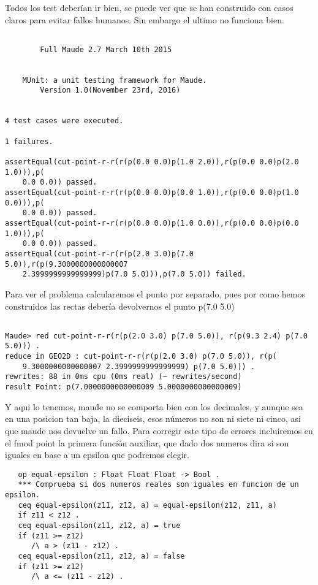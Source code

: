 Todos los test deber\'ian ir bien, se puede ver que se han construido con casos claros para evitar fallos humanos. Sin embargo el ultimo no funciona bien.

\begin{verbatim}

	    Full Maude 2.7 March 10th 2015


	MUnit: a unit testing framework for Maude.
		Version 1.0(November 23rd, 2016)


4 test cases were executed.

1 failures.

assertEqual(cut-point-r-r(r(p(0.0 0.0)p(1.0 2.0)),r(p(0.0 0.0)p(2.0 1.0))),p(
    0.0 0.0)) passed.
assertEqual(cut-point-r-r(r(p(0.0 0.0)p(0.0 1.0)),r(p(0.0 0.0)p(1.0 0.0))),p(
    0.0 0.0)) passed.
assertEqual(cut-point-r-r(r(p(0.0 0.0)p(1.0 0.0)),r(p(0.0 0.0)p(0.0 1.0))),p(
    0.0 0.0)) passed.
assertEqual(cut-point-r-r(r(p(2.0 3.0)p(7.0 5.0)),r(p(9.3000000000000007
    2.3999999999999999)p(7.0 5.0))),p(7.0 5.0)) failed.

\end{verbatim}

Para ver el problema calcularemos el punto por separado, pues por como hemos construidos las rectas deber\'ia devolvernos el punto p(7.0 5.0)

\begin{verbatim}

Maude> red cut-point-r-r(r(p(2.0 3.0) p(7.0 5.0)), r(p(9.3 2.4) p(7.0 5.0))) .
reduce in GEO2D : cut-point-r-r(r(p(2.0 3.0) p(7.0 5.0)), r(p(
    9.3000000000000007 2.3999999999999999) p(7.0 5.0))) .
rewrites: 88 in 0ms cpu (0ms real) (~ rewrites/second)
result Point: p(7.0000000000000009 5.0000000000000009)

\end{verbatim}

Y aqui lo tenemos, maude no se comporta bien con los decimales, y aunque sea en una posicion tan baja, la dieciseis, esos n\'umeros no son ni siete ni cinco, asi que maude nos devuelve un fallo.
Para corregir este tipo de errores incluiremos en el fmod point la primera funci\'on auxiliar, que dado dos numeros dira si son iguales en base a un epsilon que podremos elegir.

\begin{verbatim}
   op equal-epsilon : Float Float Float -> Bool .
   *** Comprueba si dos numeros reales son iguales en funcion de un epsilon.
   ceq equal-epsilon(z11, z12, a) = equal-epsilon(z12, z11, a)
   if z11 < z12 .
   ceq equal-epsilon(z11, z12, a) = true
   if (z11 >= z12) 
      /\ a > (z11 - z12) .
   ceq equal-epsilon(z11, z12, a) = false
   if (z11 >= z12) 
      /\ a <= (z11 - z12) .

\end{verbatim}   

